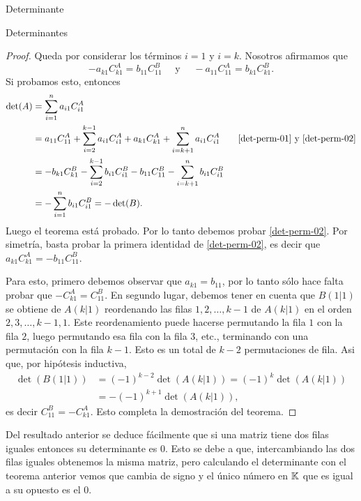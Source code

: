 \begin{chapter}{Determinante}
\begin{section}{Determinantes}
\begin{proof}
      Queda por considerar los términos $i = 1$ y $i = k$. Nosotros afirmamos que
      \begin{equation}\label{det-perm-02}
          -	a_{k1}C^A_{k1} =  b_{11}C^B_{11}  \quad \text{ y } \quad - a_{11}C^A_{11} = b_{k1}C^B_{k1}.
      \end{equation}
      Si probamos esto, entonces
      \begin{align*}
          \det(A) & = \sum_{i=1}^{n}  a_{i1}C^A_{i1}                                                                                                                                \\
                  & = a_{11}C^A_{11} +  \sum_{i=2}^{k-1}  a_{i1}C^A_{i1} + a_{k1}C^A_{k1} + \sum_{i=k+1}^{n}  a_{i1}C^A_{i1}\qquad \text{\eqref{det-perm-01} y \eqref{det-perm-02}} \\
                  & = -b_{k1}C^B_{k1} - \sum_{i=2}^{k-1}  b_{i1}C^B_{i1} - b_{11}C^B_{11} - \sum_{i=k+1}^{n}  b_{i1}C^B_{i1}                                                        \\
                  & = - \sum_{i=1}^{n}  b_{i1}C^B_{i1} =- \det(B).
      \end{align*}
      Luego el teorema está probado. Por lo tanto debemos probar \eqref{det-perm-02}. Por simetría, basta probar la primera identidad de \eqref{det-perm-02},  es decir  que $	a_{k1}C^A_{k1} = - b_{11}C^B_{11}$.

      Para esto, primero debemos observar que $a_{k1} = b_{11}$, por lo tanto sólo hace falta probar que $-C^A_{k1} = C^B_{11}$. En segundo lugar, debemos tener  en cuenta que $B(1|1)$ se obtiene de $A(k|1)$ reordenando las filas $1,2,\ldots, k -1$  de $A(k|1)$ en el orden $2,3, \ldots, k-1,1$. Este reordenamiento puede hacerse permutando la fila $1$ con la fila $2$, luego permutando esa fila con la fila $3$, etc., terminando con una permutación con la fila $k-1$. Esto es un total de $k - 2$  permutaciones de fila. Asi que, por hipótesis inductiva,
      \begin{align*}
          \det(B(1|1)) & = (-1)^{k-2}\det(A(k|1)) = (-1)^{k}\det(A(k|1)) \\
                       & = - (-1)^{k+1}\det(A(k|1)),
      \end{align*}
      es decir $C^B_{11} = -C^A_{k1}$. Esto completa la demostración del teorema.
  \end{proof}

  \begin{observacion*}
      Del resultado anterior se deduce fácilmente que si una matriz tiene dos filas iguales entonces su determinante es 0. Esto se debe a que, intercambiando las dos filas iguales obtenemos la misma matriz, pero calculando el determinante con el teorema anterior vemos que cambia de signo y el único número en $\mathbb K$ que es igual a su opuesto es el 0.
  \end{observacion*}


\end{section}
\end{chapter}
